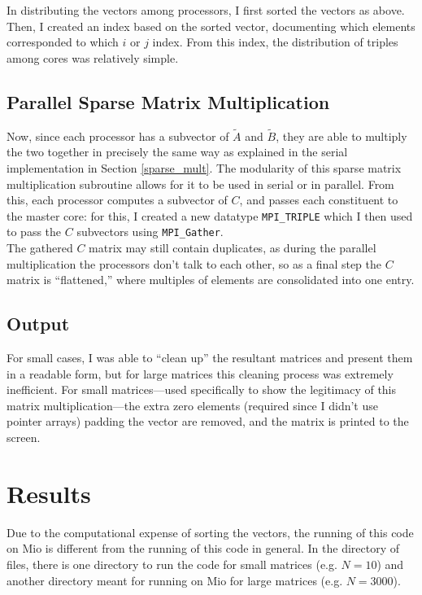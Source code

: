 \documentclass{article}
\begin{document}
In distributing the vectors among processors, I first sorted the vectors as
above. Then, I created an index based on the sorted vector, documenting which
elements corresponded to which $i$ or $j$ index. From this index, the
distribution of triples among cores was relatively simple. 

\subsection{Parallel Sparse Matrix Multiplication}
Now, since each processor has a subvector of $\tilde{A}$ and $\tilde{B}$, they
are able to multiply the two together in precisely the same way as explained in
the serial implementation in Section \ref{sparse_mult}. The modularity of this
sparse matrix multiplication subroutine allows for it to be used in serial or in
parallel. From this, each processor computes a subvector of $C$, and passes each
constituent to the master core: for this, I created a new datatype
\texttt{MPI\_TRIPLE} which I then used to pass the $C$ subvectors
using \texttt{MPI\_Gather}. \\

The gathered $C$ matrix may still contain duplicates, as during the parallel
multiplication the processors don't talk to each other, so as a final step the
$C$ matrix is ``flattened,'' where multiples of elements are consolidated into one
entry. 

\subsection{Output}
For small cases, I was able to ``clean up'' the resultant matrices and present
them in a readable form, but for large matrices this cleaning process was
extremely inefficient.  For small matrices---used specifically to show the
legitimacy of this matrix multiplication---the extra zero elements (required
since I didn't use pointer arrays) padding the vector are removed, and the
matrix is printed to the screen. 

\section{Results \label{results}}
Due to the computational expense of sorting the vectors, the running of this
code on Mio is different from the running of this code in general. In the
directory of files, there is one directory to run the code for small matrices
(e.g. $N=10$) and another directory meant for running on Mio for large matrices
(e.g. $N=3000$). \\
\end{document}
